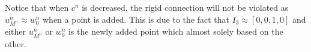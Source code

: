 Notice that when $c^n$ is decreased, the rigid connection will not be violated as $u_{M^n}^n \approx w_0^n$ when a point is added. This is due to the fact that $I_3\approx [0, 0, 1, 0]$ and either $u_{M^n}^n$ or $w_0^n$ is the newly added point which almost solely based on the other.
